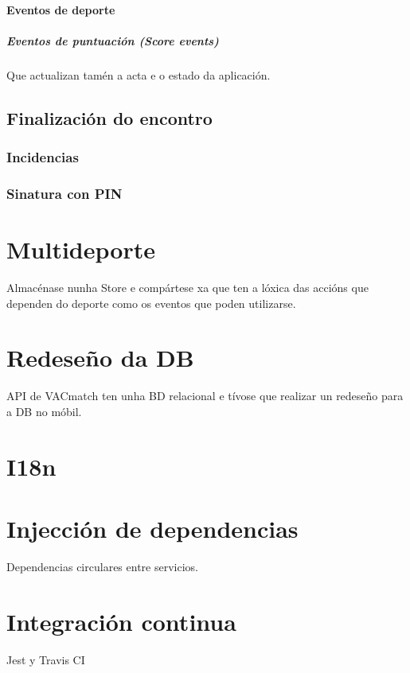       \paragraph{Eventos de deporte}
        \subparagraph{Eventos de puntuación (Score events)}
        Que actualizan tamén a acta e o estado da aplicación.

    \subsection{Finalización do encontro}

      \subsubsection{Incidencias}

      \subsubsection{Sinatura con PIN}

  \section{Multideporte}
  Almacénase nunha Store e compártese xa que ten a lóxica das accións que dependen do 
  deporte como os eventos que poden utilizarse.

  \section{Redeseño da DB}
  API de VACmatch ten unha BD relacional e tívose que realizar un redeseño para a DB no 
móbil.

  \section{I18n}

  \section{Injección de dependencias}
  Dependencias circulares entre servicios.

  \section{Integración continua}
  Jest y Travis CI

